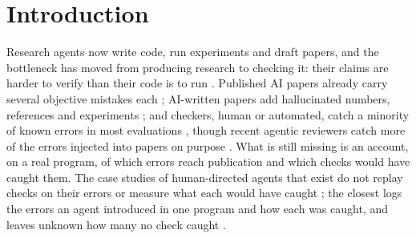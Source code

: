 \documentclass[11pt]{article}
\begin{document}
\begin{abstract}
\ChaoFamDedupN{} errors, depending on how the occasions are counted. Pilots on one synthetic study, in four presentations of up to
\PilotTokLargeGpt{}k tokens (the largest with GPT-6.1 Sol only), then tested the writing step: given the whole record, Claude
Opus~5.5 and GPT-6.1 Sol between them reconciled a stale draft with the final state in \PilotPapers{} papers without an error in the
twelve claims scored in each, by an unvalidated automated scorer. These pilots, a floor result with later models, cannot show why our
errors happened. They are consistent with the reading the assistant recorded in the notebook after them, on 6 October, from its
dated entries of August and September: the errors came from the process, with papers frozen before the record settled, intentions
written as facts and no reconciliation pass before deposit; the notebook itself also carried some of the errors. Three working
rules follow.
\end{abstract}

\section{Introduction}

Research agents now write code, run experiments and draft papers, and the bottleneck has moved from producing research to checking
it: their claims are harder to verify than their code is to run \citep{ding2026verification}. Published AI papers already carry
several objective mistakes each \citep{bianchi2025err}; AI-written papers add hallucinated numbers, references and experiments
\citep{beel2025sakana,miyai2025jr,bianchi2025agents4science,miyai2026paperrecon}; and checkers, human or automated, catch a minority
of known errors in most evaluations \citep{schroter2008errors,son2025spot,xi2025flaws,baumgartner2026scicoqa}, though recent agentic
reviewers catch more of the errors injected into papers on purpose \citep{nguyen2026agenticreview}. What is still missing is an account,
on a real program, of which errors reach publication and which checks would have caught them. The case studies of human-directed
agents that exist do not replay checks on their errors or measure what each would have caught
\citep{alzahrani2026persistent,nguyen2026physics,schwartz2026vibe}; the closest logs the errors an agent introduced in one program
and how each was caught, and leaves unknown how many no check caught \citep{orden2026wrongclaim}.
\end{document}
